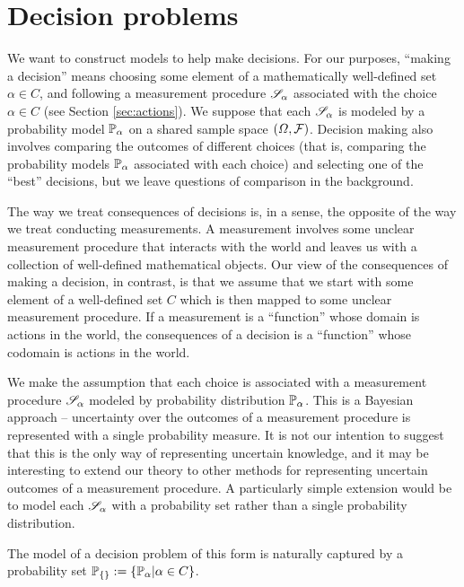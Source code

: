 

\section{Decision problems}

We want to construct models to help make decisions. For our purposes, ``making a decision'' means choosing some element of a mathematically well-defined set $\alpha\in C$, and following a measurement procedure $\mathscr{S}_\alpha$ associated with the choice $\alpha\in C$ (see Section \ref{sec:actions}). We suppose that each $\mathscr{S}_\alpha$ is modeled by a probability model $\mathbb{P}_\alpha$ on a shared sample space $(\Omega,\mathcal{F})$. Decision making also involves comparing the outcomes of different choices (that is, comparing the probability models $\mathbb{P}_\alpha$ associated with each choice) and selecting one of the ``best'' decisions, but we leave questions of comparison in the background.

The way we treat consequences of decisions is, in a sense, the opposite of the way we treat conducting measurements. A measurement involves some unclear measurement procedure that interacts with the world and leaves us with a collection of well-defined mathematical objects. Our view of the consequences of making a decision, in contrast, is that we assume that we start with some element of a well-defined set $C$ which is then mapped to some unclear measurement procedure. If a measurement is a ``function'' whose domain is actions in the world, the consequences of a decision is a ``function'' whose codomain is actions in the world.

We make the assumption that each choice is associated with a measurement procedure $\mathscr{S}_\alpha$ modeled by probability distribution $\mathbb{P}_\alpha$. This is a Bayesian approach -- uncertainty over the outcomes of a measurement procedure is represented with a single probability measure. It is not our intention to suggest that this is the only way of representing uncertain knowledge, and it may be interesting to extend our theory to other methods for representing uncertain outcomes of a measurement procedure. A particularly simple extension would be to model each $\mathscr{S}_\alpha$ with a probability set rather than a single probability distribution. 

The model of a decision problem of this form is naturally captured by a probability set $\mathbb{P}_{\{\}}:=\{\mathbb{P}_\alpha|\alpha\in C\}$. 

